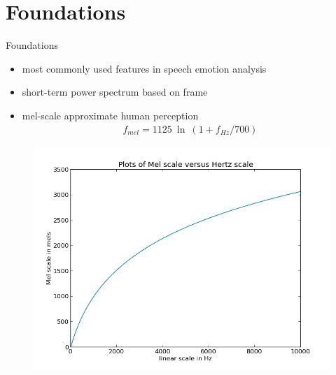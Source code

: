 \begin{frame}
	\tableofcontents
\end{frame}


\section{Foundations} %
	\begin{frame}[t]{Foundations}
			\begin{itemize}
				\item most commonly used features in speech emotion analysis 
				\item short-term power spectrum based on frame
				\item mel-scale approximate human perception
				\begin{align}
				f_{mel} = 1125~\ln~(1+f_{Hz}/700)\nonumber
				\end{align}
			\end{itemize}

		\begin{figure}
		 \includegraphics[width = 0.5\linewidth]{MelvsHz.png}
		\end{figure}
	\end{frame}
	
